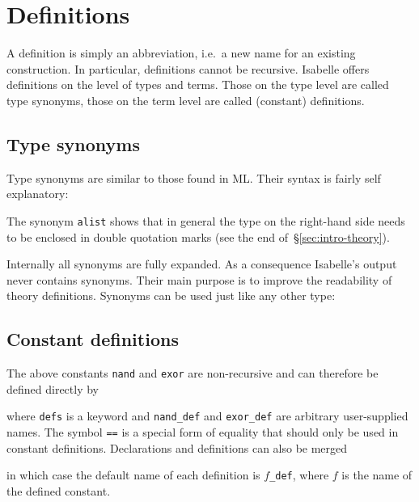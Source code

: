 \section{Definitions}
\label{sec:Definitions}

A definition is simply an abbreviation, i.e.\ a new name for an existing
construction. In particular, definitions cannot be recursive. Isabelle offers
definitions on the level of types and terms. Those on the type level are
called type synonyms, those on the term level are called (constant)
definitions.


\subsection{Type synonyms}

Type synonyms are similar to those found in ML. Their syntax is fairly self
explanatory:
\begin{ttbox}
\end{ttbox}
The synonym \texttt{alist} shows that in general the type on the right-hand
side needs to be enclosed in double quotation marks
(see the end of~\S\ref{sec:intro-theory}).

Internally all synonyms are fully expanded.  As a consequence Isabelle's
output never contains synonyms.  Their main purpose is to improve the
readability of theory definitions.  Synonyms can be used just like any other
type:
\begin{ttbox}
\end{ttbox}

\subsection{Constant definitions}
\label{sec:ConstDefinitions}

The above constants \texttt{nand} and \texttt{exor} are non-recursive and can
therefore be defined directly by
\begin{ttbox}
\end{ttbox}
where \texttt{defs} is a keyword and \texttt{nand_def} and \texttt{exor_def}
are arbitrary user-supplied names.
The symbol \texttt{==} is a special form of equality
that should only be used in constant definitions.
Declarations and definitions can also be merged
\begin{ttbox}
\end{ttbox}
in which case the default name of each definition is $f$\texttt{_def}, where
$f$ is the name of the defined constant.

